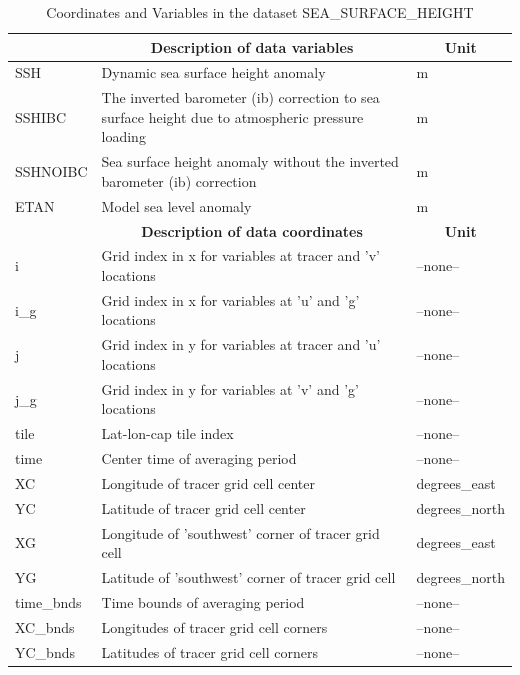 \begin{longtable}{|m{}|m{}|m{}|}
\caption{Coordinates and Variables in the dataset SEA\_SURFACE\_HEIGHT}
\label{tab:table-SEA_SURFACE_HEIGHT-fields} \\ 
\hline \endhead \hline \endfoot
\rowcolor{lightgray} \multicolumn{1}{|c|}{\textbf{Variables}} & \multicolumn{1}{|c|}{\textbf{Description of data variables}} &  \multicolumn{1}{|c|}{\textbf{Unit}}\\ \hline
SSH &Dynamic sea surface height anomaly &m  \\ \hline
SSHIBC &The inverted barometer (ib) correction to sea surface height due to atmospheric pressure loading &m  \\ \hline
SSHNOIBC &Sea surface height anomaly without the inverted barometer (ib) correction &m  \\ \hline
ETAN &Model sea level anomaly &m  \\ \hline
\rowcolor{lightgray} \multicolumn{1}{|c|}{\textbf{Coordinates}} & \multicolumn{1}{|c|}{\textbf{Description of data coordinates}} &  \multicolumn{1}{|c|}{\textbf{Unit}}\\ \hline
i &Grid index in x for variables at tracer and 'v' locations &--none--  \\ \hline
i\_g &Grid index in x for variables at 'u' and 'g' locations &--none--  \\ \hline
j &Grid index in y for variables at tracer and 'u' locations &--none--  \\ \hline
j\_g &Grid index in y for variables at 'v' and 'g' locations &--none--  \\ \hline
tile &Lat-lon-cap tile index &--none--  \\ \hline
time &Center time of averaging period &--none--  \\ \hline
XC &Longitude of tracer grid cell center &degrees\_east  \\ \hline
YC &Latitude of tracer grid cell center &degrees\_north  \\ \hline
XG &Longitude of 'southwest' corner of tracer grid cell &degrees\_east  \\ \hline
YG &Latitude of 'southwest' corner of tracer grid cell &degrees\_north  \\ \hline
time\_bnds &Time bounds of averaging period &--none--  \\ \hline
XC\_bnds &Longitudes of tracer grid cell corners &--none--  \\ \hline
YC\_bnds &Latitudes of tracer grid cell corners &--none--  \\ \hline
\end{longtable}

